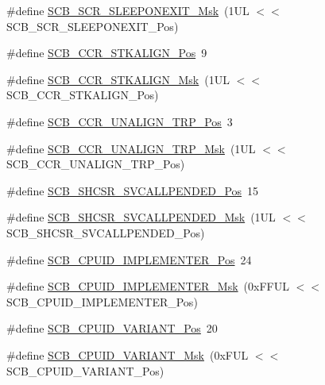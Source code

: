 \begin{DoxyCompactItemize}
\#define \mbox{\hyperlink{group___c_m_s_i_s___s_c_b_ga50a243e317b9a70781b02758d45b05ee}{S\+C\+B\+\_\+\+S\+C\+R\+\_\+\+S\+L\+E\+E\+P\+O\+N\+E\+X\+I\+T\+\_\+\+Msk}}~(1\+U\+L $<$$<$ S\+C\+B\+\_\+\+S\+C\+R\+\_\+\+S\+L\+E\+E\+P\+O\+N\+E\+X\+I\+T\+\_\+\+Pos)
\item 
\#define \mbox{\hyperlink{group___c_m_s_i_s___s_c_b_gac2d20a250960a432cc74da59d20e2f86}{S\+C\+B\+\_\+\+C\+C\+R\+\_\+\+S\+T\+K\+A\+L\+I\+G\+N\+\_\+\+Pos}}~9
\item 
\#define \mbox{\hyperlink{group___c_m_s_i_s___s_c_b_ga33cf22d3d46af158a03aad25ddea1bcb}{S\+C\+B\+\_\+\+C\+C\+R\+\_\+\+S\+T\+K\+A\+L\+I\+G\+N\+\_\+\+Msk}}~(1\+U\+L $<$$<$ S\+C\+B\+\_\+\+C\+C\+R\+\_\+\+S\+T\+K\+A\+L\+I\+G\+N\+\_\+\+Pos)
\item 
\#define \mbox{\hyperlink{group___c_m_s_i_s___s_c_b_gac4e4928b864ea10fc24dbbc57d976229}{S\+C\+B\+\_\+\+C\+C\+R\+\_\+\+U\+N\+A\+L\+I\+G\+N\+\_\+\+T\+R\+P\+\_\+\+Pos}}~3
\item 
\#define \mbox{\hyperlink{group___c_m_s_i_s___s_c_b_ga68c96ad594af70c007923979085c99e0}{S\+C\+B\+\_\+\+C\+C\+R\+\_\+\+U\+N\+A\+L\+I\+G\+N\+\_\+\+T\+R\+P\+\_\+\+Msk}}~(1\+U\+L $<$$<$ S\+C\+B\+\_\+\+C\+C\+R\+\_\+\+U\+N\+A\+L\+I\+G\+N\+\_\+\+T\+R\+P\+\_\+\+Pos)
\item 
\#define \mbox{\hyperlink{group___c_m_s_i_s___s_c_b_ga2f93ec9b243f94cdd3e94b8f0bf43641}{S\+C\+B\+\_\+\+S\+H\+C\+S\+R\+\_\+\+S\+V\+C\+A\+L\+L\+P\+E\+N\+D\+E\+D\+\_\+\+Pos}}~15
\item 
\#define \mbox{\hyperlink{group___c_m_s_i_s___s_c_b_ga6095a7acfbad66f52822b1392be88652}{S\+C\+B\+\_\+\+S\+H\+C\+S\+R\+\_\+\+S\+V\+C\+A\+L\+L\+P\+E\+N\+D\+E\+D\+\_\+\+Msk}}~(1\+U\+L $<$$<$ S\+C\+B\+\_\+\+S\+H\+C\+S\+R\+\_\+\+S\+V\+C\+A\+L\+L\+P\+E\+N\+D\+E\+D\+\_\+\+Pos)
\item 
\#define \mbox{\hyperlink{group___c_m_s_i_s___s_c_b_ga58686b88f94f789d4e6f429fe1ff58cf}{S\+C\+B\+\_\+\+C\+P\+U\+I\+D\+\_\+\+I\+M\+P\+L\+E\+M\+E\+N\+T\+E\+R\+\_\+\+Pos}}~24
\item 
\#define \mbox{\hyperlink{group___c_m_s_i_s___s_c_b_ga0932b31faafd47656a03ced75a31d99b}{S\+C\+B\+\_\+\+C\+P\+U\+I\+D\+\_\+\+I\+M\+P\+L\+E\+M\+E\+N\+T\+E\+R\+\_\+\+Msk}}~(0x\+F\+F\+U\+L $<$$<$ S\+C\+B\+\_\+\+C\+P\+U\+I\+D\+\_\+\+I\+M\+P\+L\+E\+M\+E\+N\+T\+E\+R\+\_\+\+Pos)
\item 
\#define \mbox{\hyperlink{group___c_m_s_i_s___s_c_b_ga104462bd0815391b4044a70bd15d3a71}{S\+C\+B\+\_\+\+C\+P\+U\+I\+D\+\_\+\+V\+A\+R\+I\+A\+N\+T\+\_\+\+Pos}}~20
\item 
\#define \mbox{\hyperlink{group___c_m_s_i_s___s_c_b_gad358dfbd04300afc1824329d128b99e8}{S\+C\+B\+\_\+\+C\+P\+U\+I\+D\+\_\+\+V\+A\+R\+I\+A\+N\+T\+\_\+\+Msk}}~(0x\+F\+U\+L $<$$<$ S\+C\+B\+\_\+\+C\+P\+U\+I\+D\+\_\+\+V\+A\+R\+I\+A\+N\+T\+\_\+\+Pos)

\end{DoxyCompactItemize}
